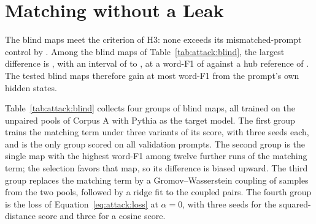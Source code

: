 \section{Matching without a Leak}\label{sec:attack:blind}

The blind maps meet the criterion of H3: none exceeds its mismatched-prompt control by .
Among the blind maps of Table~\ref{tab:attack:blind}, the largest difference is , with an interval of  to , at a word-F1 of  against a hub reference of . %
The tested blind maps therefore gain at most  word-F1 from the prompt's own hidden states.

Table~\ref{tab:attack:blind} collects four groups of blind maps, all trained on the unpaired pools of Corpus A with Pythia as the target model.
The first group trains the matching term under three variants of its score, with three seeds each, and is the only group scored on all  validation prompts.
The second group is the single map with the highest word-F1 among twelve further runs of the matching term; the selection favors that map, so its difference is biased upward.
The third group replaces the matching term by a Gromov--Wasserstein coupling of samples from the two pools, followed by a ridge fit to the coupled pairs. %
The fourth group is the loss of Equation~\ref{eq:attack:loss} at $\alpha = 0$, with three seeds for the squared-distance score and three for a cosine score.

